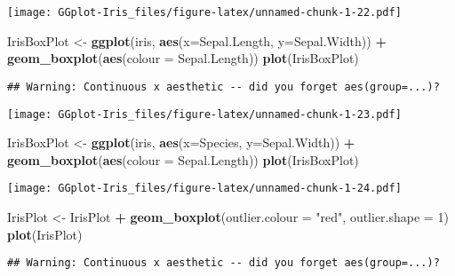 \documentclass[]{article}
\newenvironment{Shaded}{\begin{snugshade}}{\end{snugshade}}
\newcommand{\KeywordTok}[1]{\textcolor[rgb]{0.13,0.29,0.53}{\textbf{#1}}}
\newcommand{\DataTypeTok}[1]{\textcolor[rgb]{0.13,0.29,0.53}{#1}}
\newcommand{\DecValTok}[1]{\textcolor[rgb]{0.00,0.00,0.81}{#1}}
\newcommand{\StringTok}[1]{\textcolor[rgb]{0.31,0.60,0.02}{#1}}
\newcommand{\OperatorTok}[1]{\textcolor[rgb]{0.81,0.36,0.00}{\textbf{#1}}}
\newcommand{\NormalTok}[1]{#1}
\begin{document}
\texttt{[image: GGplot-Iris\_files/figure-latex/unnamed-chunk-1-22.pdf]}

\begin{Shaded}
\begin{Highlighting}[]
\NormalTok{IrisBoxPlot  <-}\StringTok{ }\KeywordTok{ggplot}\NormalTok{(iris, }\KeywordTok{aes}\NormalTok{(}\DataTypeTok{x=}\NormalTok{Sepal.Length, }\DataTypeTok{y=}\NormalTok{Sepal.Width)) }\OperatorTok{+}\StringTok{ }\KeywordTok{geom_boxplot}\NormalTok{(}\KeywordTok{aes}\NormalTok{(}\DataTypeTok{colour =}\NormalTok{ Sepal.Length))}
\KeywordTok{plot}\NormalTok{(IrisBoxPlot)}
\end{Highlighting}
\end{Shaded}

\begin{verbatim}
## Warning: Continuous x aesthetic -- did you forget aes(group=...)?
\end{verbatim}

\texttt{[image: GGplot-Iris\_files/figure-latex/unnamed-chunk-1-23.pdf]}

\begin{Shaded}
\begin{Highlighting}[]
\NormalTok{IrisBoxPlot  <-}\StringTok{ }\KeywordTok{ggplot}\NormalTok{(iris, }\KeywordTok{aes}\NormalTok{(}\DataTypeTok{x=}\NormalTok{Species, }\DataTypeTok{y=}\NormalTok{Sepal.Width)) }\OperatorTok{+}\StringTok{ }\KeywordTok{geom_boxplot}\NormalTok{(}\KeywordTok{aes}\NormalTok{(}\DataTypeTok{colour =}\NormalTok{ Sepal.Length))}
\KeywordTok{plot}\NormalTok{(IrisBoxPlot)}
\end{Highlighting}
\end{Shaded}

\texttt{[image: GGplot-Iris\_files/figure-latex/unnamed-chunk-1-24.pdf]}

\begin{Shaded}
\begin{Highlighting}[]
\NormalTok{IrisPlot <-}\StringTok{ }\NormalTok{IrisPlot  }\OperatorTok{+}\StringTok{ }\KeywordTok{geom_boxplot}\NormalTok{(}\DataTypeTok{outlier.colour =} \StringTok{"red"}\NormalTok{, }\DataTypeTok{outlier.shape =} \DecValTok{1}\NormalTok{)}
\KeywordTok{plot}\NormalTok{(IrisPlot)}
\end{Highlighting}
\end{Shaded}

\begin{verbatim}
## Warning: Continuous x aesthetic -- did you forget aes(group=...)?
\end{verbatim}
\end{document}
